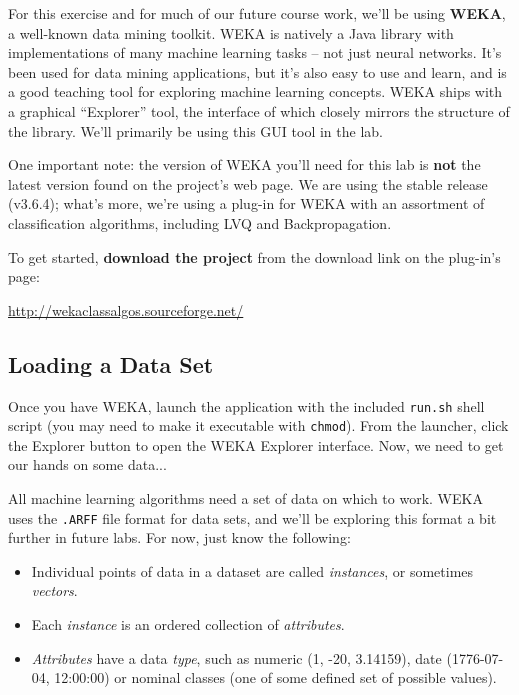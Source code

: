 \documentclass[11pt]{cselabheader}
\begin{document}
For this exercise and for much of our future course work, we'll be using \textbf{WEKA}, a well-known data mining toolkit. WEKA is natively a Java library with implementations of many machine learning tasks -- not just neural networks. It's been used for data mining applications, but it's also easy to use and learn, and is a good teaching tool for exploring machine learning concepts. WEKA ships with a graphical ``Explorer'' tool, the interface of which closely mirrors the structure of the library. We'll primarily be using this GUI tool in the lab.

One important note: the version of WEKA you'll need for this lab is \textbf{not} the latest version found on the project's web page. We are using the stable release (v3.6.4); what's more, we're using a plug-in for WEKA with an assortment of classification algorithms, including LVQ and Backpropagation.

To get started, \textbf{download the project} from the download link on the plug-in's page:
\begin{center}
  \url{http://wekaclassalgos.sourceforge.net/}
\end{center}

\subsection{Loading a Data Set}

Once you have WEKA, launch the application with the included \texttt{run.sh} shell script (you may need to make it executable with \texttt{chmod}). From the launcher, click the Explorer button to open the WEKA Explorer interface. Now, we need to get our hands on some data...

All machine learning algorithms need a set of data on which to work. WEKA uses the \texttt{.ARFF} file format for data sets, and we'll be exploring this format a bit further in future labs. For now, just know the following:

\begin{itemize}
  \item Individual points of data in a dataset are called \textit{instances}, or sometimes \textit{vectors}.
  \item Each \textit{instance} is an ordered collection of \textit{attributes}.
  \item \textit{Attributes} have a data \textit{type}, such as numeric (1, -20, 3.14159), date (1776-07-04, 12:00:00) or nominal classes (one of some defined set of possible values).
\end{itemize}
\end{document}

